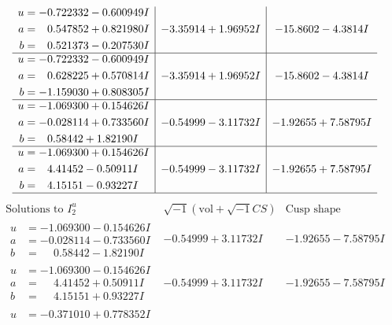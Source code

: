 \documentclass[1p]{elsarticle_modified}
\theoremstyle{definition}
\newcommand{\I}{\sqrt{-1}}
\begin{document}
$$\begin{array}{c|c|c}
\begin{aligned}
u &= -0.722332 - 0.600949 I \\
a &= \phantom{-}0.547852 + 0.821980 I \\
b &= \phantom{-}0.521373 - 0.207530 I\end{aligned}
 & -3.35914 + 1.96952 I & -15.8602 - 4.3814 I \\ \hline\begin{aligned}
u &= -0.722332 - 0.600949 I \\
a &= \phantom{-}0.628225 + 0.570814 I \\
b &= -1.159030 + 0.808305 I\end{aligned}
 & -3.35914 + 1.96952 I & -15.8602 - 4.3814 I \\ \hline\begin{aligned}
u &= -1.069300 + 0.154626 I \\
a &= -0.028114 + 0.733560 I \\
b &= \phantom{-}0.58442 + 1.82190 I\end{aligned}
 & -0.54999 - 3.11732 I & -1.92655 + 7.58795 I \\ \hline\begin{aligned}
u &= -1.069300 + 0.154626 I \\
a &= \phantom{-}4.41452 - 0.50911 I \\
b &= \phantom{-}4.15151 - 0.93227 I\end{aligned}
 & -0.54999 - 3.11732 I & -1.92655 + 7.58795 I\\
 \hline 
 \end{array}$$\newpage$$\begin{array}{c|c|c}  
\text{Solutions to }I^u_{2}& \I (\text{vol} + \sqrt{-1}CS) & \text{Cusp shape}\\
 \hline 
\begin{aligned}
u &= -1.069300 - 0.154626 I \\
a &= -0.028114 - 0.733560 I \\
b &= \phantom{-}0.58442 - 1.82190 I\end{aligned}
 & -0.54999 + 3.11732 I & -1.92655 - 7.58795 I \\ \hline\begin{aligned}
u &= -1.069300 - 0.154626 I \\
a &= \phantom{-}4.41452 + 0.50911 I \\
b &= \phantom{-}4.15151 + 0.93227 I\end{aligned}
 & -0.54999 + 3.11732 I & -1.92655 - 7.58795 I \\ \hline\begin{aligned}
u &= -0.371010 + 0.778352 I \\

\end{aligned}
\end{array}$$
\end{document}
